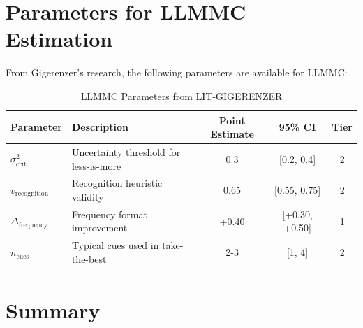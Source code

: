 \section{Parameters for LLMMC Estimation}
\label{sec:gi-llmmc}

From Gigerenzer's research, the following parameters are available for LLMMC:

\begin{table}[htbp]
\centering
\caption{LLMMC Parameters from LIT-GIGERENZER}
\label{tab:gi-llmmc}
\renewcommand{\arraystretch}{1.3}
\begin{tabular}{@{}llccc@{}}
\toprule
\textbf{Parameter} & \textbf{Description} & \textbf{Point Estimate} & \textbf{95\% CI} & \textbf{Tier} \\
\midrule
$\sigma^2_{\text{crit}}$ & Uncertainty threshold for less-is-more & 0.3 & [0.2, 0.4] & 2 \\
$v_{\text{recognition}}$ & Recognition heuristic validity & 0.65 & [0.55, 0.75] & 2 \\
$\Delta_{\text{frequency}}$ & Frequency format improvement & +0.40 & [+0.30, +0.50] & 1 \\
$n_{\text{cues}}$ & Typical cues used in take-the-best & 2-3 & [1, 4] & 2 \\
\bottomrule
\end{tabular}
\end{table}


\section{Summary}
\label{sec:gi-summary}

